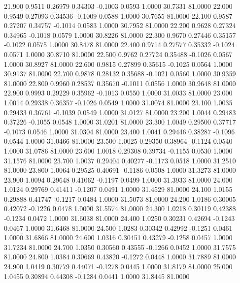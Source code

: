   21.900   0.9511   0.26979   0.34303  -0.1003   0.0593   1.0000  30.7331  81.0000
  22.000   0.9549   0.27093   0.34536  -0.1009   0.0588   1.0000  30.7655  81.0000
  22.100   0.9587   0.27207   0.34757  -0.1014   0.0583   1.0000  30.7952  81.0000
  22.200   0.9628   0.27324   0.34965  -0.1018   0.0579   1.0000  30.8226  81.0000
  22.300   0.9670   0.27446   0.35157  -0.1022   0.0575   1.0000  30.8478  81.0000
  22.400   0.9714   0.27577   0.35332  -0.1024   0.0571   1.0000  30.8710  81.0000
  22.500   0.9762   0.27724   0.35488  -0.1026   0.0567   1.0000  30.8927  81.0000
  22.600   0.9815   0.27899   0.35615  -0.1025   0.0564   1.0000  30.9137  81.0000
  22.700   0.9878   0.28132   0.35688  -0.1021   0.0560   1.0000  30.9359  81.0000
  22.800   0.9960   0.28537   0.35670  -0.1011   0.0556   1.0000  30.9648  81.0000
  22.900   0.9993   0.29229   0.35962  -0.1013   0.0550   1.0000  31.0033  81.0000
  23.000   1.0014   0.29338   0.36357  -0.1026   0.0549   1.0000  31.0074  81.0000
  23.100   1.0035   0.29433   0.36761  -0.1039   0.0549   1.0000  31.0127  81.0000
  23.200   1.0044   0.29483   0.37226  -0.1055   0.0548   1.0000  31.0201  81.0000
  23.300   1.0049   0.29500   0.37717  -0.1073   0.0546   1.0000  31.0304  81.0000
  23.400   1.0041   0.29446   0.38287  -0.1096   0.0544   1.0000  31.0466  81.0000
  23.500   1.0025   0.29350   0.38964  -0.1124   0.0540   1.0000  31.0786  81.0000
  23.600   1.0018   0.29308   0.39734  -0.1155   0.0530   1.0000  31.1576  81.0000
  23.700   1.0037   0.29404   0.40277  -0.1173   0.0518   1.0000  31.2510  81.0000
  23.800   1.0064   0.29525   0.40691  -0.1186   0.0508   1.0000  31.3273  81.0000
  23.900   1.0094   0.29648   0.41062  -0.1197   0.0499   1.0000  31.3933  81.0000
  24.000   1.0124   0.29769   0.41411  -0.1207   0.0491   1.0000  31.4529  81.0000
  24.100   1.0155   0.29888   0.41747  -0.1217   0.0484   1.0000  31.5073  81.0000
  24.200   1.0186   0.30005   0.42072  -0.1226   0.0478   1.0000  31.5574  81.0000
  24.300   1.0218   0.30119   0.42388  -0.1234   0.0472   1.0000  31.6038  81.0000
  24.400   1.0250   0.30231   0.42694  -0.1243   0.0467   1.0000  31.6468  81.0000
  24.500   1.0283   0.30342   0.42992  -0.1251   0.0461   1.0000  31.6866  81.0000
  24.600   1.0316   0.30451   0.43279  -0.1258   0.0457   1.0000  31.7234  81.0000
  24.700   1.0350   0.30560   0.43555  -0.1266   0.0452   1.0000  31.7575  81.0000
  24.800   1.0384   0.30669   0.43820  -0.1272   0.0448   1.0000  31.7889  81.0000
  24.900   1.0419   0.30779   0.44071  -0.1278   0.0445   1.0000  31.8179  81.0000
  25.000   1.0455   0.30894   0.44308  -0.1284   0.0441   1.0000  31.8445  81.0000
